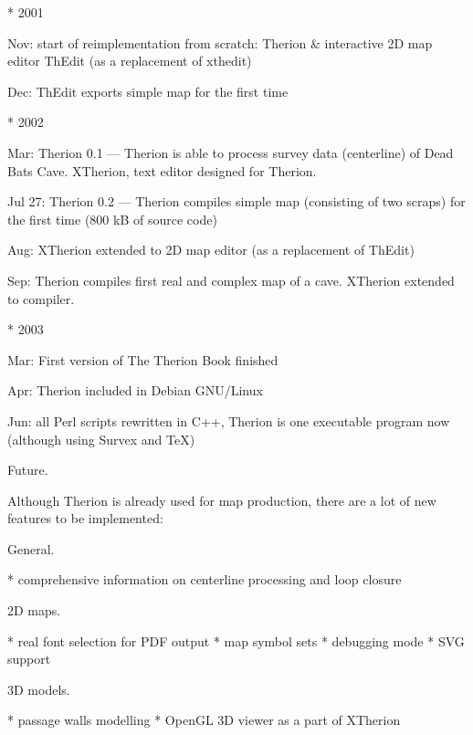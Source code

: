 * 2001

  Nov: start of reimplementation from scratch: 
       Therion \& interactive 2D map editor ThEdit
       (as a replacement of xthedit)

  Dec: ThEdit exports simple map for the first time

* 2002

  Mar: Therion 0.1 ---
       Therion is able to process survey data (centerline) of Dead Bats Cave.
       XTherion, text editor designed for Therion.

  Jul 27: Therion 0.2 ---
       Therion compiles simple map (consisting of two scraps)
       for the first time (800 kB of source code)

  Aug: XTherion extended to 2D map editor (as a replacement of ThEdit)

  Sep: Therion compiles first real and complex map of a cave. XTherion
       extended to compiler.


* 2003

  Mar: First version of The Therion Book finished

  Apr: Therion included in Debian GNU/Linux

  Jun: all Perl scripts rewritten in C++, Therion is one executable program
       now (although using Survex and TeX)
\endlist


\subchapter Future.

Although Therion is already used for map production, there are a lot of 
new features to be implemented:

\subsubchapter General.

\list
* comprehensive information on centerline processing and loop closure
\endlist

\subsubchapter 2D maps.

\list
* real font selection for PDF output
* map symbol sets
* debugging mode
* SVG support
\endlist


\subsubchapter 3D models.

\list
* passage walls modelling
* OpenGL 3D viewer as a part of XTherion
\endlist

\endinput
